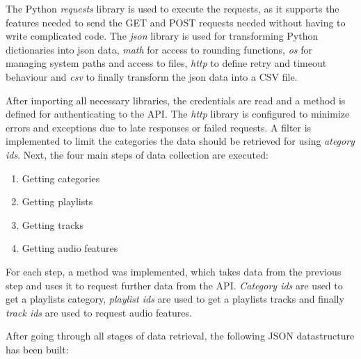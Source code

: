 The Python \emph{requests} library is used to execute the requests, as it supports the features needed to send the GET and POST
requests needed without having to write complicated code.
The \emph{json} library is used for transforming Python dictionaries into json data, \emph{math} for access to rounding functions,
\emph{os} for managing system paths and access to files, \emph{http} to define retry and timeout behaviour and \emph{csv}
to finally transform the json data into a CSV file.

After importing all necessary libraries, the credentials are read and a method is defined for authenticating to the API.
The \emph{http} library is configured to minimize errors and exceptions due to late responses or failed requests.
A filter is implemented to limit the categories the data should be retrieved for using \emph{ategory ids}.
Next, the four main steps of data collection are executed:

\begin{enumerate}
    \item Getting categories
    \item Getting playlists
    \item Getting tracks
    \item Getting audio features
\end{enumerate}

For each step, a method was implemented, which takes data from the previous step and uses it to request further data from the
API. \emph{Category ids} are used to get a playlists category, \emph{playlist ids} are used to get a playlists tracks and finally \emph{track ids}
are used to request audio features.

After going through all stages of data retrieval, the following JSON datastructure has been built:


